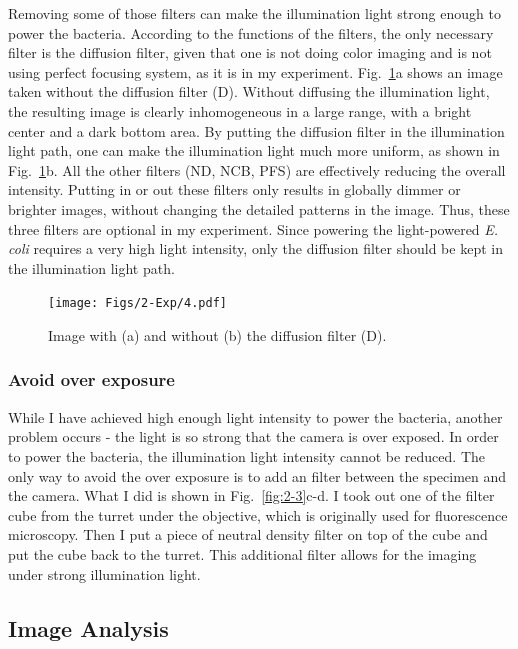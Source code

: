 Removing some of those filters can make the illumination light strong enough to power the bacteria. According to the functions of the filters, the only necessary filter is the diffusion filter, given that one is not doing color imaging and is not using perfect focusing system, as it is in my experiment. Fig.~\ref{fig:2-4}a shows an image taken without the diffusion filter (D). Without diffusing the illumination light, the resulting image is clearly inhomogeneous in a large range, with a bright center and a dark bottom area. By putting the diffusion filter in the illumination light path, one can make the illumination light much more uniform, as shown in Fig.~\ref{fig:2-4}b. All the other filters (ND, NCB, PFS) are effectively reducing the overall intensity. Putting in or out these filters only results in globally dimmer or brighter images, without changing the detailed patterns in the image. Thus, these three filters are optional in my experiment. Since powering the light-powered \textit{E. coli} requires a very high light intensity, only the diffusion filter should be kept in the illumination light path.

\begin{figure}[!]
	\begin{center}
	\texttt{[image: Figs/2-Exp/4.pdf]}
	\end{center}
	\caption[Figure 2.4:]
	{
	Image with (a) and without (b) the diffusion filter (D).
	}
	\label{fig:2-4}
\end{figure}

\subsubsection{Avoid over exposure}

While I have achieved high enough light intensity to power the bacteria, another problem occurs - the light is so strong that the camera is over exposed. In order to power the bacteria, the illumination light intensity cannot be reduced. The only way to avoid the over exposure is to add an filter between the specimen and the camera. What I did is shown in Fig.~\ref{fig:2-3}c-d. I took out one of the filter cube from the turret under the objective, which is originally used for fluorescence microscopy. Then I put a piece of neutral density filter on top of the cube and put the cube back to the turret. This additional filter allows for the imaging under strong illumination light.

\subsection{Image Analysis}

